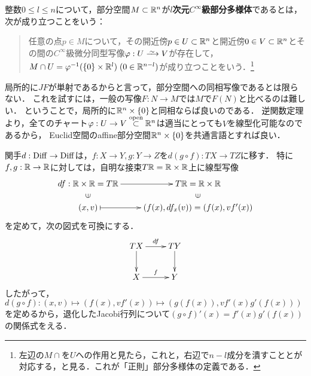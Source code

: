 \documentclass[uplatex,dvipdfmx]{jsreport}
\begin{document}
\begin{definition}\label{def-regular-submanifold-in-Euclidean-space}
    整数$0\le l\le n$について，部分空間$M\subset\mathbb{R}^n$が\textbf{$l$次元$C^\infty$級部分多様体}であるとは，
    次が成り立つことをいう：
    \begin{quote}
        任意の点$p\in M$について，その開近傍$p\in U\subset\mathbb{R}^n$と開近傍$0\in V\subset\mathbb{R}^n$とその間の$C^\infty$級微分同型写像$\varphi:U\iso V$が存在して，
        $M\cap U=\varphi^{-1}(\{0\}\times\mathbb{R}^l)\;(0\in\mathbb{R}^{n-l})$が成り立つことをいう．\footnote{左辺の$M\cap$を$U$への作用と見たら，これと，右辺で$n-l$成分を潰すこととが対応する，と見る．これが「正則」部分多様体の定義である．}
    \end{quote}
\end{definition}
\begin{remarks}
    局所的に$JF$が単射であるからと言って，部分空間への同相写像であるとは限らない．
    これを試すには，一般の写像$F:N\to M$では$M$で$F(N)$と比べるのは難しい．
    ということで，局所的に$\mathbb{R}^n\times\{0\}$と同相ならば良いのである．
    逆関数定理より，全てのチャート$\varphi:U\to V\overset{\mathrm{open}}{\subset}\mathbb{R}^n$は適当にとっても$V$を線型化可能なのであるから，
    Euclid空間のaffine部分空間$\mathbb{R}^n\times\{0\}$を共通言語とすれば良い．
\end{remarks}

\begin{discussion}
    関手$d:\mathrm{Diff}\to\mathrm{Diff}$は，$f:X\to Y,g:Y\to Z$を$d(g\circ f):TX\to TZ$に移す．
    特に$f,g:\mathbb{R}\to\mathbb{R}$に対しては，自明な接束$T\mathbb{R}=\mathbb{R}\times\mathbb{R}$上に線型写像
    \[\xymatrix@R-2pc{
        df:\R\times\R=T\R\ar[r]&T\R=\R\times\R\\
        \rotatebox[origin=c]{90}{$\in$}&\rotatebox[origin=c]{90}{$\in$}\\
        (x,v)\ar@{|->}[r]&(f(x),df_x(v))=(f(x),vf'(x))
    }\]
    を定めて，次の図式を可換にする．
    \[\xymatrix{
        TX\ar[r]^-{df}\ar[d]&TY\ar[d]\\
        X\ar[r]^-f&Y
    }\]
    したがって，$d(g\circ f):(x,v)\mapsto(f(x),vf'(x))\mapsto(g(f(x)),vf'(x)g'(f(x)))$を定めるから，退化したJacobi行列について$(g\circ f)'(x)=f'(x)g'(f(x))$の関係式をえる．
\end{discussion}
\end{document}

